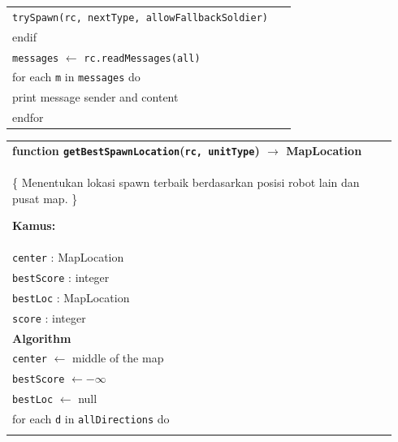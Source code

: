 \documentclass{article}
\newenvironment{pseudobox}
{
\centering
\begin{longtable}{|p{0.94\linewidth}|}
\hline
}
{
\\ \hline
\end{longtable}
\vspace{0.05cm}
}
\begin{document}
\begin{enumerate}[label=\alph*.]
\begin{pseudobox}
\hspace*{3em}\texttt{trySpawn(rc, nextType, allowFallbackSoldier)} \\

\hspace*{1.5em}endif \\

\hspace*{1.5em}\texttt{messages} $\leftarrow$ \texttt{rc.readMessages(all)} \\

\hspace*{1.5em}for each \texttt{m} in \texttt{messages} do \\
\hspace*{3em}print message sender and content \\
\hspace*{1.5em}endfor
\end{pseudobox}

\begin{pseudobox}
\textbf{function \texttt{getBestSpawnLocation}(\texttt{rc, unitType}) $\rightarrow$ MapLocation} \\
\{ Menentukan lokasi spawn terbaik berdasarkan posisi robot lain dan pusat map. \}

\textbf{Kamus:} \\
\hspace*{1.5em}\texttt{center} : MapLocation \\
\hspace*{1.5em}\texttt{bestScore} : integer \\
\hspace*{1.5em}\texttt{bestLoc} : MapLocation \\
\hspace*{1.5em}\texttt{score} : integer \\

\textbf{Algorithm} \\

\hspace*{1.5em}\texttt{center} $\leftarrow$ middle of the map \\

\hspace*{1.5em}\texttt{bestScore} $\leftarrow -\infty$ \\
\hspace*{1.5em}\texttt{bestLoc} $\leftarrow$ null \\

\hspace*{1.5em}for each \texttt{d} in \texttt{allDirections} do \\


\end{pseudobox}
\end{enumerate}
\end{document}
